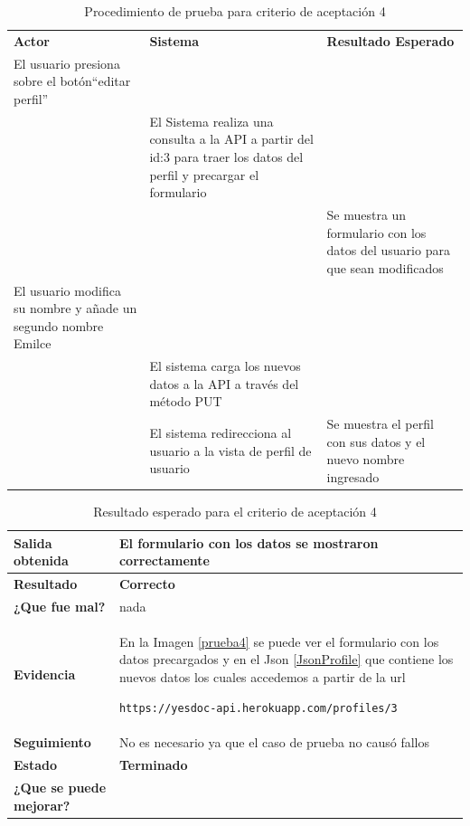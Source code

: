     {\scriptsize
	\begin{table}[h]
    \centering
	\begin{longtable}{|p{5cm}|p{5cm}|p{4cm}|}
	    \hline \hline \rowcolor[gray]{0.9}
        \multicolumn{3}{||l|}{\textbf{Procedimiento de Prueba - ``Editar perfil''}} \\
        \hline 
        \rowcolor[gray]{0.9}
	    \textbf{Actor} & \textbf{Sistema}& \textbf{Resultado Esperado} \\  \hline
	   El usuario presiona sobre el botón``editar perfil'' & & \\ \hline
        & El Sistema realiza una consulta a la API a partir del id:3 para traer los datos del perfil y precargar el formulario &   \\ \hline
        & &  Se muestra un formulario con los datos del usuario para que sean modificados\\ \hline
        El usuario modifica su nombre y añade un segundo nombre Emilce&& \\ \hline
        &El sistema carga los nuevos datos a la API a través del método PUT&\\ \hline
        &El sistema redirecciona al usuario a la vista de perfil de usuario&Se muestra el perfil con sus datos y el nuevo nombre ingresado\\ \hline
	    \end{longtable}
        \caption{Procedimiento de prueba para criterio de aceptación 4}
    	\end{table}
    }
    
    {\scriptsize
	\begin{table}[h]
	\centering
	\begin{tabular}{|l|p{10cm}|}
	    \hline 
	    \textbf{Salida obtenida}& El formulario con los datos se mostraron correctamente\\ \hline
	    \textbf{Resultado}& \textbf{Correcto}\\ \hline
        \textbf{¿Que fue mal?}& nada\\ \hline      
        \textbf{Evidencia}& En la Imagen \ref{prueba4} se puede ver el formulario con los datos precargados y en el Json \ref{JsonProfile} que contiene los nuevos datos los cuales accedemos a partir de la url \begin{lstlisting} 
https://yesdoc-api.herokuapp.com/profiles/3 \end{lstlisting}\\ \hline
        \textbf{Seguimiento}& No es necesario ya que el caso de prueba no causó
fallos
\\ \hline
        \textbf{Estado}& \textbf{Terminado}\\ \hline        
        \textbf{¿Que se puede mejorar?}& \\ \hline              
	    \end{tabular}
        \caption{Resultado esperado para el criterio de aceptación 4}
    	\end{table}
	}
\clearpage

